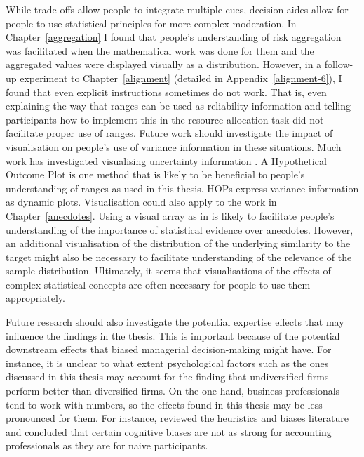 \documentclass[a4paper, nobind, dvipsnames]{templates/ociamthesis}
\theoremstyle{definition}
\theoremstyle{definition}
\theoremstyle{definition}
\theoremstyle{definition}
\theoremstyle{remark}
\begin{document}
While trade-offs allow people to integrate multiple cues, decision aides allow
for people to use statistical principles for more complex moderation. In
Chapter~\ref{aggregation} I found that people's understanding of risk
aggregation was facilitated when the mathematical work was done for them and the
aggregated values were displayed visually as a distribution. However, in a
follow-up experiment to Chapter~\ref{alignment} (detailed in
Appendix~\ref{alignment-6}), I found that even explicit instructions sometimes
do not work. That is, even explaining the way that ranges can be used as
reliability information and telling participants how to implement this in the
resource allocation task did not facilitate proper use of ranges. Future work
should investigate the impact of visualisation on people's use of variance
information in these situations. Much work has investigated visualising
uncertainty information \autocite{bostrom2008,maceachren1992,kinkeldey2017,padilla2018,davis1997,ristovski2014,brodlie2012,johnson2003,potter2012,lipkus1999,lipkus2007,spiegelhalter2011,pang1997,kox2018,lapinski2009,torsneyweir2015}. A Hypothetical Outcome Plot \autocites[HOP;][]{kale2019,hullman2015} is one method that is likely to be beneficial to people's
understanding of ranges as used in this thesis. HOPs express variance
information as dynamic plots. Visualisation could also apply to the work in
Chapter~\ref{anecdotes}. Using a visual array as in \textcite{jaramillo2019} is likely to
facilitate people's understanding of the importance of statistical evidence over
anecdotes. However, an additional visualisation of the distribution of the
underlying similarity to the target might also be necessary to facilitate
understanding of the relevance of the sample distribution. Ultimately, it seems
that visualisations of the effects of complex statistical concepts are often
necessary for people to use them appropriately.

Future research should also investigate the potential expertise effects that may
influence the findings in the thesis. This is important because of the potential
downstream effects that biased managerial decision-making might have. For
instance, it is unclear to what extent psychological factors such as the ones
discussed in this thesis may account for the finding that undiversified firms
perform better than diversified firms. On the one hand, business professionals
tend to work with numbers, so the effects found in this thesis may be less
pronounced for them. For instance, \textcite{smith1991} reviewed the heuristics and biases
literature and concluded that certain cognitive biases are not as strong for
accounting professionals as they are for naive participants.
\end{document}
